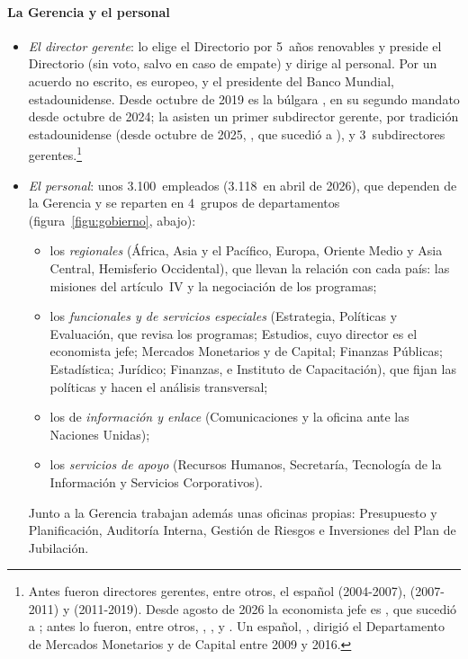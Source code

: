 \documentclass[11pt]{article}
\begin{document}
\paragraph{La Gerencia y el personal}

\begin{itemize}
\item \emph{El director gerente}: lo elige el Directorio por 5~años renovables y preside el Directorio (sin voto, salvo en caso de empate) y dirige al personal. Por un acuerdo no escrito, es europeo, y el presidente del Banco Mundial, estadounidense. Desde octubre de 2019 es la búlgara , en su segundo mandato desde octubre de 2024; la asisten un primer subdirector gerente, por tradición estadounidense (desde octubre de 2025, , que sucedió a ), y 3~subdirectores gerentes\nocite{FMI2026InformeAnual}.\footnote{Antes fueron directores gerentes, entre otros, el español  (2004-2007),  (2007-2011) y  (2011-2019). Desde agosto de 2026 la economista jefe es , que sucedió a ; antes lo fueron, entre otros, , ,  y . Un español, , dirigió el Departamento de Mercados Monetarios y de Capital entre 2009 y 2016.}
\item \emph{El personal}: unos 3.100~empleados (3.118~en abril de 2026), que dependen de la Gerencia y se reparten en 4~grupos de departamentos (figura~\ref{figu:gobierno}, abajo)\nocite{FMI2026InformeAnual}:
  \begin{itemize}
  \item los \emph{regionales} (África, Asia y el Pacífico, Europa, Oriente Medio y Asia Central, Hemisferio Occidental), que llevan la relación con cada país: las misiones del artículo~IV y la negociación de los programas;
  \item los \emph{funcionales y de servicios especiales} (Estrategia, Políticas y Evaluación, que revisa los programas; Estudios, cuyo director es el economista jefe; Mercados Monetarios y de Capital; Finanzas Públicas; Estadística; Jurídico; Finanzas, e Instituto de Capacitación), que fijan las políticas y hacen el análisis transversal;
  \item los de \emph{información y enlace} (Comunicaciones y la oficina ante las Naciones Unidas);
  \item los \emph{servicios de apoyo} (Recursos Humanos, Secretaría, Tecnología de la Información y Servicios Corporativos).
  \end{itemize}
  Junto a la Gerencia trabajan además unas oficinas propias: Presupuesto y Planificación, Auditoría Interna, Gestión de Riesgos e Inversiones del Plan de Jubilación.
\end{itemize}
\end{document}
